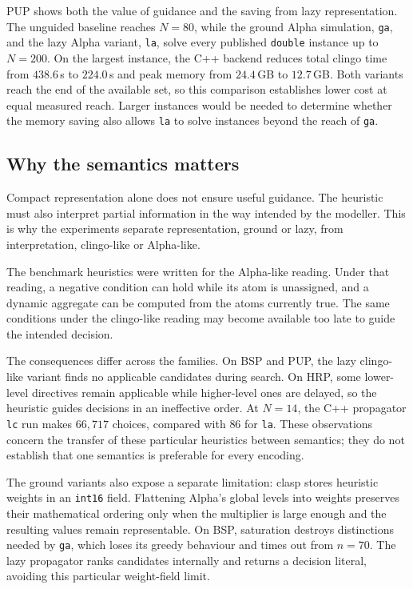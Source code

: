 PUP shows both the value of guidance and the saving from lazy representation. The unguided baseline reaches $N=80$, while the ground Alpha simulation, \texttt{ga}, and the lazy Alpha variant, \texttt{la}, solve every published \texttt{double} instance up to $N=200$. On the largest instance, the C++ backend reduces total clingo time from $438.6$\,s to $224.0$\,s and peak memory from $24.4$\,GB to $12.7$\,GB. Both variants reach the end of the available set, so this comparison establishes lower cost at equal measured reach. Larger instances would be needed to determine whether the memory saving also allows \texttt{la} to solve instances beyond the reach of \texttt{ga}.

\subsection{Why the semantics matters}

Compact representation alone does not ensure useful guidance. The heuristic must also interpret partial information in the way intended by the modeller. This is why the experiments separate representation, ground or lazy, from interpretation, clingo-like or Alpha-like.

The benchmark heuristics were written for the Alpha-like reading. Under that reading, a negative condition can hold while its atom is unassigned, and a dynamic aggregate can be computed from the atoms currently true. The same conditions under the clingo-like reading may become available too late to guide the intended decision.

The consequences differ across the families. On BSP and PUP, the lazy clingo-like variant finds no applicable candidates during search. On HRP, some lower-level directives remain applicable while higher-level ones are delayed, so the heuristic guides decisions in an ineffective order. At $N=14$, the C++ propagator \texttt{lc} run makes $66{,}717$ choices, compared with $86$ for \texttt{la}. These observations concern the transfer of these particular heuristics between semantics; they do not establish that one semantics is preferable for every encoding.

The ground variants also expose a separate limitation: clasp stores heuristic weights in an \texttt{int16} field. Flattening Alpha's global levels into weights preserves their mathematical ordering only when the multiplier is large enough and the resulting values remain representable. On BSP, saturation destroys distinctions needed by \texttt{ga}, which loses its greedy behaviour and times out from $n=70$. The lazy propagator ranks candidates internally and returns a decision literal, avoiding this particular weight-field limit.

